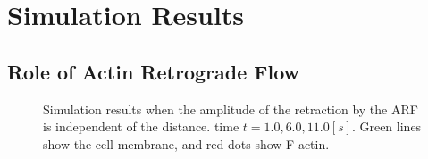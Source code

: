 \documentclass[a4paper,12pt, oneside]{book}
\begin{document}
\section{Simulation Results}
\subsection{Role of Actin Retrograde Flow}
\begin{figure}[tbp]
 \caption{Simulation results when the amplitude of the retraction by the ARF is independent of the distance. time $t = 1.0, 6.0,11.0 [s]$. Green lines show the cell membrane, and red dots show F-actin.}
 \label{fig:res0}
\end{figure}
\end{document}
